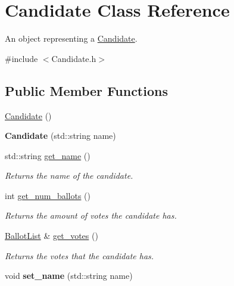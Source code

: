 \hypertarget{class_candidate}{}\section{Candidate Class Reference}
\label{class_candidate}


An object representing a \hyperlink{class_candidate}{Candidate}.  




{\ttfamily \#include $<$Candidate.\+h$>$}

\subsection*{Public Member Functions}
\begin{DoxyCompactItemize}
\item 
\hyperlink{class_candidate_aa2747741fb662af5e8f3d01d1d1a43b6}{Candidate} ()
\item 
{\bfseries Candidate} (std\+::string name)\hypertarget{class_candidate_a99c1eda1eeecf4bbd054049449954c90}{}\label{class_candidate_a99c1eda1eeecf4bbd054049449954c90}

\item 
std\+::string \hyperlink{class_candidate_a9012b2acb87ecf5cfc3ba693f8c66ca1}{get\+\_\+name} ()\hypertarget{class_candidate_a9012b2acb87ecf5cfc3ba693f8c66ca1}{}\label{class_candidate_a9012b2acb87ecf5cfc3ba693f8c66ca1}

\begin{DoxyCompactList}\small\item\em Returns the name of the candidate. \end{DoxyCompactList}\item 
int \hyperlink{class_candidate_a4b7d42b2508d8899a2662e3b8edbb60d}{get\+\_\+num\+\_\+ballots} ()\hypertarget{class_candidate_a4b7d42b2508d8899a2662e3b8edbb60d}{}\label{class_candidate_a4b7d42b2508d8899a2662e3b8edbb60d}

\begin{DoxyCompactList}\small\item\em Returns the amount of votes the candidate has. \end{DoxyCompactList}\item 
\hyperlink{class_ballot_list}{Ballot\+List} \& \hyperlink{class_candidate_a3908fe9bb0b7a58def1d1b7dbc0bb80e}{get\+\_\+votes} ()\hypertarget{class_candidate_a3908fe9bb0b7a58def1d1b7dbc0bb80e}{}\label{class_candidate_a3908fe9bb0b7a58def1d1b7dbc0bb80e}

\begin{DoxyCompactList}\small\item\em Returns the votes that the candidate has. \end{DoxyCompactList}\item 
void {\bfseries set\+\_\+name} (std\+::string name)\hypertarget{class_candidate_a8b3f41d0b9792719dde4f10b643fe527}{}\label{class_candidate_a8b3f41d0b9792719dde4f10b643fe527}


\end{DoxyCompactItemize}
